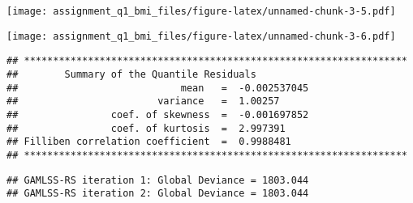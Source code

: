 \begin{Shaded}
\begin{Highlighting}[]
\OtherTok{\textless{}{-}} \NormalTok{, }\NormalTok{, }\NormalTok{(}\NormalTok{,}\NormalTok{), }\NormalTok{(}\NormalTok{,}\NormalTok{), }
\end{Highlighting}
\end{Shaded}

\texttt{[image: assignment\_q1\_bmi\_files/figure-latex/unnamed-chunk-3-5.pdf]}

\begin{Shaded}
\begin{Highlighting}[]
\end{Highlighting}
\end{Shaded}

\texttt{[image: assignment\_q1\_bmi\_files/figure-latex/unnamed-chunk-3-6.pdf]}

\begin{verbatim}
## ******************************************************************
##        Summary of the Quantile Residuals
##                            mean   =  -0.002537045 
##                        variance   =  1.00257 
##                coef. of skewness  =  -0.001697852 
##                coef. of kurtosis  =  2.997391 
## Filliben correlation coefficient  =  0.9988481 
## ******************************************************************
\end{verbatim}

\begin{Shaded}
\begin{Highlighting}[]
\OtherTok{\textless{}{-}} \SpecialCharTok{\textasciitilde{}}\NormalTok{, }
\end{Highlighting}
\end{Shaded}

\begin{verbatim}
## GAMLSS-RS iteration 1: Global Deviance = 1803.044 
## GAMLSS-RS iteration 2: Global Deviance = 1803.044
\end{verbatim}

